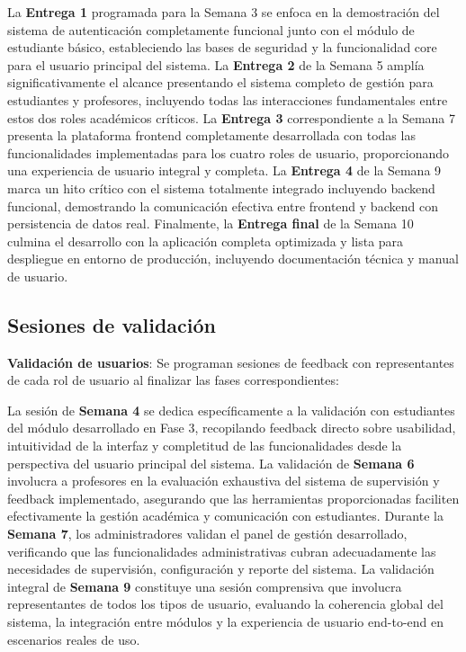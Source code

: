 \documentclass[12pt,a4paper,oneside]{report}
\begin{document}
La \textbf{Entrega 1} programada para la Semana 3 se enfoca en la demostración del sistema de autenticación completamente funcional junto con el módulo de estudiante básico, estableciendo las bases de seguridad y la funcionalidad core para el usuario principal del sistema. La \textbf{Entrega 2} de la Semana 5 amplía significativamente el alcance presentando el sistema completo de gestión para estudiantes y profesores, incluyendo todas las interacciones fundamentales entre estos dos roles académicos críticos. La \textbf{Entrega 3} correspondiente a la Semana 7 presenta la plataforma frontend completamente desarrollada con todas las funcionalidades implementadas para los cuatro roles de usuario, proporcionando una experiencia de usuario integral y completa. La \textbf{Entrega 4} de la Semana 9 marca un hito crítico con el sistema totalmente integrado incluyendo backend funcional, demostrando la comunicación efectiva entre frontend y backend con persistencia de datos real. Finalmente, la \textbf{Entrega final} de la Semana 10 culmina el desarrollo con la aplicación completa optimizada y lista para despliegue en entorno de producción, incluyendo documentación técnica y manual de usuario.

\subsection{Sesiones de validación}\label{sesiones-de-validaciuxf3n}

\textbf{Validación de usuarios}: Se programan sesiones de feedback con
representantes de cada rol de usuario al finalizar las fases
correspondientes:

La sesión de \textbf{Semana 4} se dedica específicamente a la validación con estudiantes del módulo desarrollado en Fase 3, recopilando feedback directo sobre usabilidad, intuitividad de la interfaz y completitud de las funcionalidades desde la perspectiva del usuario principal del sistema. La validación de \textbf{Semana 6} involucra a profesores en la evaluación exhaustiva del sistema de supervisión y feedback implementado, asegurando que las herramientas proporcionadas faciliten efectivamente la gestión académica y comunicación con estudiantes. Durante la \textbf{Semana 7}, los administradores validan el panel de gestión desarrollado, verificando que las funcionalidades administrativas cubran adecuadamente las necesidades de supervisión, configuración y reporte del sistema. La validación integral de \textbf{Semana 9} constituye una sesión comprensiva que involucra representantes de todos los tipos de usuario, evaluando la coherencia global del sistema, la integración entre módulos y la experiencia de usuario end-to-end en escenarios reales de uso.
\end{document}
